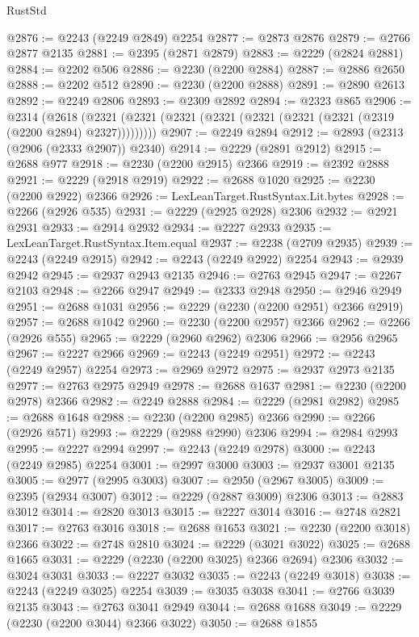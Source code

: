\begin{lexlean}{RustStd}
\begin{coremodule}
@2876 := @2243 (@2249 @2849) @2254
@2877 := @2873 @2876
@2879 := @2766 @2877 @2135
@2881 := @2395 (@2871 @2879)
@2883 := @2229 (@2824 @2881)
@2884 := @2202 @506
@2886 := @2230 (@2200 @2884)
@2887 := @2886 @2650
@2888 := @2202 @512
@2890 := @2230 (@2200 @2888)
@2891 := @2890 @2613
@2892 := @2249 @2806
@2893 := @2309 @2892
@2894 := @2323 @865
@2906 := @2314
    (@2618 (@2321 (@2321 (@2321 (@2321 (@2321 (@2321 (@2321 (@2319 (@2200 @2894) @2327)))))))))
@2907 := @2249 @2894
@2912 := @2893 (@2313 (@2906 (@2333 @2907)) @2340)
@2914 := @2229 (@2891 @2912)
@2915 := @2688 @977
@2918 := @2230 (@2200 @2915) @2366
@2919 := @2392 @2888
@2921 := @2229 (@2918 @2919)
@2922 := @2688 @1020
@2925 := @2230 (@2200 @2922) @2366
@2926 := LexLeanTarget.RustSyntax.Lit.bytes
@2928 := @2266 (@2926 @535)
@2931 := @2229 (@2925 @2928) @2306
@2932 := @2921 @2931
@2933 := @2914 @2932
@2934 := @2227 @2933
@2935 := LexLeanTarget.RustSyntax.Item.equal
@2937 := @2238 (@2709 @2935)
@2939 := @2243 (@2249 @2915)
@2942 := @2243 (@2249 @2922) @2254
@2943 := @2939 @2942
@2945 := @2937 @2943 @2135
@2946 := @2763 @2945
@2947 := @2267 @2103
@2948 := @2266 @2947
@2949 := @2333 @2948
@2950 := @2946 @2949
@2951 := @2688 @1031
@2956 := @2229 (@2230 (@2200 @2951) @2366 @2919)
@2957 := @2688 @1042
@2960 := @2230 (@2200 @2957) @2366
@2962 := @2266 (@2926 @555)
@2965 := @2229 (@2960 @2962) @2306
@2966 := @2956 @2965
@2967 := @2227 @2966
@2969 := @2243 (@2249 @2951)
@2972 := @2243 (@2249 @2957) @2254
@2973 := @2969 @2972
@2975 := @2937 @2973 @2135
@2977 := @2763 @2975 @2949
@2978 := @2688 @1637
@2981 := @2230 (@2200 @2978) @2366
@2982 := @2249 @2888
@2984 := @2229 (@2981 @2982)
@2985 := @2688 @1648
@2988 := @2230 (@2200 @2985) @2366
@2990 := @2266 (@2926 @571)
@2993 := @2229 (@2988 @2990) @2306
@2994 := @2984 @2993
@2995 := @2227 @2994
@2997 := @2243 (@2249 @2978)
@3000 := @2243 (@2249 @2985) @2254
@3001 := @2997 @3000
@3003 := @2937 @3001 @2135
@3005 := @2977 (@2995 @3003)
@3007 := @2950 (@2967 @3005)
@3009 := @2395 (@2934 @3007)
@3012 := @2229 (@2887 @3009) @2306
@3013 := @2883 @3012
@3014 := @2820 @3013
@3015 := @2227 @3014
@3016 := @2748 @2821
@3017 := @2763 @3016
@3018 := @2688 @1653
@3021 := @2230 (@2200 @3018) @2366
@3022 := @2748 @2810
@3024 := @2229 (@3021 @3022)
@3025 := @2688 @1665
@3031 := @2229 (@2230 (@2200 @3025) @2366 @2694) @2306
@3032 := @3024 @3031
@3033 := @2227 @3032
@3035 := @2243 (@2249 @3018)
@3038 := @2243 (@2249 @3025) @2254
@3039 := @3035 @3038
@3041 := @2766 @3039 @2135
@3043 := @2763 @3041 @2949
@3044 := @2688 @1688
@3049 := @2229 (@2230 (@2200 @3044) @2366 @3022)
@3050 := @2688 @1855

\end{coremodule}
\end{lexlean}

